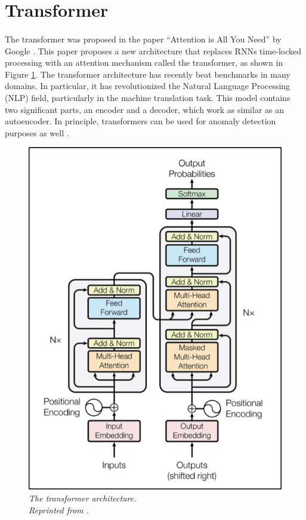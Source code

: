\section{Transformer}
\paragraph{}
The transformer was proposed in the paper ``Attention is All You Need'' by Google \cite{vaswani_shazeer_parmar_uszkoreit_jones_n_gomez_kaiser_polosukhin_2017}. This paper proposes a new architecture that replaces RNNs time-locked processing with an attention mechanism called the transformer, as shown in Figure \ref{fig:attention}. The transformer architecture has recently beat benchmarks in many domains. In particular, it has revolutionized the Natural Language Processing (NLP) field, particularly in the machine translation task. This model contains two significant parts, an encoder and a decoder, which work as similar as an autoencoder. In principle, transformers can be used for anomaly detection purposes as well \cite{mishra_verk_fornasier_piciarelli_foresti_2021}.

\begin{figure}[H]
  \centering
  \caption[The transformer architecture.]{\emph{The transformer architecture. \\Reprinted from \citeauthor{vaswani_shazeer_parmar_uszkoreit_jones_n_gomez_kaiser_polosukhin_2017} \citeyear{vaswani_shazeer_parmar_uszkoreit_jones_n_gomez_kaiser_polosukhin_2017}.}}\label{fig:attention}
  \includegraphics[scale = 0.4
  ]{figures/attention.jpg}  
\end{figure}

